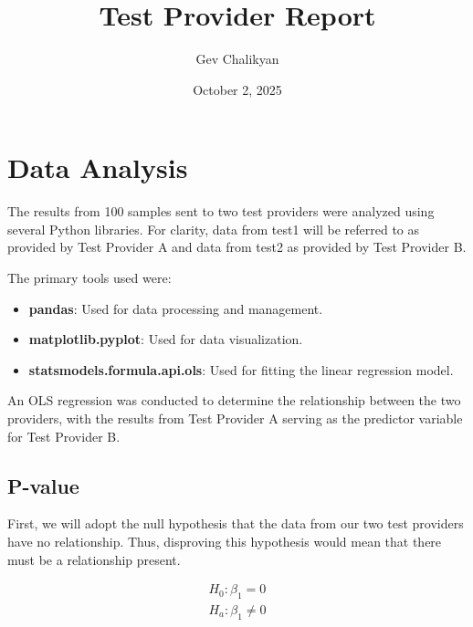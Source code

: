 \documentclass{article}
\title{Test Provider Report}
\author{Gev Chalikyan}
\date{October 2, 2025}
\begin{document}
  \maketitle
  


  \section{Data Analysis} \hrulefill
  \vspace{2mm}
  
  The results from 100 samples sent to two test providers were analyzed using several Python libraries. For clarity, data from test1 will be referred to as provided by Test Provider A and data from test2 as provided by Test Provider B.

  The primary tools used were:

  \begin{center}
    \begin{minipage}{0.8\textwidth}
      \begin{itemize}
        \item \textbf{pandas}: Used for data processing and management.
        \item \textbf{matplotlib.pyplot}: Used for data visualization.
        \item \textbf{statsmodels.formula.api.ols}: Used for fitting the linear regression model.
      \end{itemize}
    \end{minipage}
  \end{center}

  An OLS regression was conducted to determine the relationship between the two providers, with the results from Test Provider A serving as the predictor variable for Test Provider B.
  
  
  
  \subsection{P-value}
  
    First, we will adopt the null hypothesis that the data from our two test providers have no relationship. Thus, disproving this hypothesis would mean that there must be a relationship present.
  
    \begin{equation}
      \begin{split}
        H_0: \beta_1=0 \\
        H_a: \beta_1\neq0
      \end{split}
    \end{equation}
\end{document}
